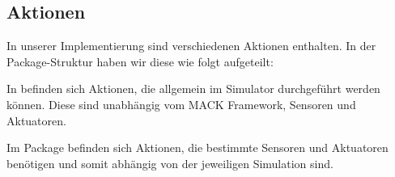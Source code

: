 \subsection{Aktionen}\label{subsec:real_actions}
In unserer Implementierung sind verschiedenen Aktionen enthalten. In der Package-Struktur haben wir diese wie folgt aufgeteilt:

In  befinden sich Aktionen, die allgemein im Simulator durchgeführt werden können. Diese sind unabhängig vom MACK Framework, Sensoren und Aktuatoren.

Im Package  befinden sich Aktionen, die bestimmte Sensoren und Aktuatoren benötigen und somit abhängig von der jeweiligen Simulation sind.

